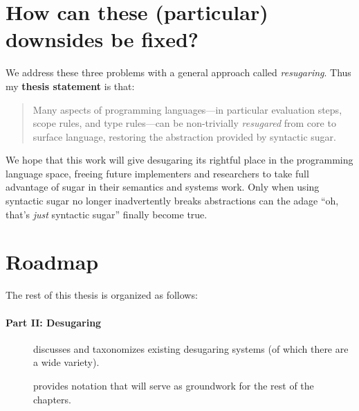 \section{How can these (particular) downsides be fixed?}

We address these three problems with a general approach called
\emph{resugaring}. Thus my \textbf{thesis statement} is that:
\begin{quote}
Many aspects of programming languages---in particular evaluation
steps, scope rules, and type rules---can be non-trivially
\emph{resugared} from core to surface language, restoring the
abstraction provided by syntactic sugar.
\end{quote}

We hope that this work will give desugaring its rightful
place in the programming language space, freeing future implementers
and researchers to take full advantage of sugar in their semantics
and systems work. Only when using syntactic sugar no longer
inadvertently breaks abstractions can the adage
``oh, that's \emph{just} syntactic sugar'' finally become true.

\section{Roadmap}

The rest of this thesis is organized as follows:
\paragraph{Part II: Desugaring}
\begin{description}
\item[] discusses and taxonomizes existing
  desugaring systems (of which there are a wide variety).
\item[] provides notation that
  will serve as groundwork for the rest of the chapters.
\end{description}
